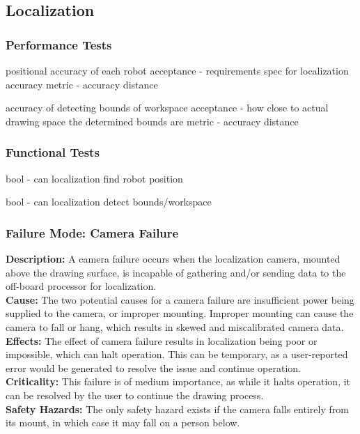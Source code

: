 
\subsection{Localization}
\label{sec:verification_localization}


\subsubsection{Performance Tests}
\label{sec:localization_pt}

positional accuracy of each robot
acceptance - requirements spec for localization accuracy
metric - accuracy distance

accuracy of detecting bounds of workspace
acceptance - how close to actual drawing space the determined bounds are
metric - accuracy distance

\subsubsection{Functional Tests}
\label{sec:localization_ft}

bool - can localization find robot position

bool - can localization detect bounds/workspace


\subsubsection{Failure Mode: Camera Failure}
\label{sec:localization_fm_cam}
\textbf{Description:} A camera failure occurs when the localization camera, mounted above the drawing surface, is incapable of gathering and/or sending data to the off-board processor for localization.\\
\textbf{Cause:} The two potential causes for a camera failure are insufficient power being supplied to the camera, or improper mounting. Improper mounting can cause the camera to fall or hang, which results in skewed and miscalibrated camera data.\\
\textbf{Effects:}  The effect of camera failure results in localization being poor or impossible, which can halt operation. This can be temporary, as a user-reported error would be generated to resolve the issue and continue operation.\\
\textbf{Criticality:}  This failure is of medium importance, as while it halts operation, it can be resolved by the user to continue the drawing process.\\
\textbf{Safety Hazards:} The only safety hazard exists if the camera falls entirely from its mount, in which case it may fall on a person below. \\

